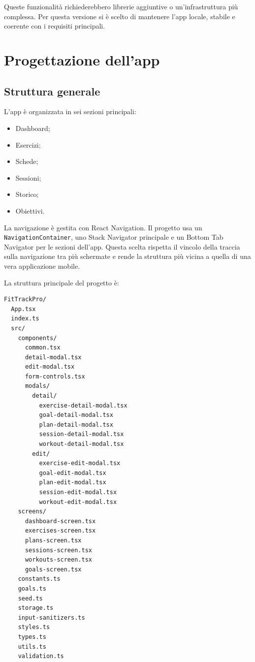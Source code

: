 \documentclass[11pt,a4paper]{article}
\begin{document}
Queste funzionalità richiederebbero librerie aggiuntive o un'infrastruttura più complessa. Per questa versione si è scelto di mantenere l'app locale, stabile e coerente con i requisiti principali.

\section{Progettazione dell'app}

\subsection{Struttura generale}

L'app è organizzata in sei sezioni principali:

\begin{itemize}
  \item Dashboard;
  \item Esercizi;
  \item Schede;
  \item Sessioni;
  \item Storico;
  \item Obiettivi.
\end{itemize}

La navigazione è gestita con React Navigation. Il progetto usa un \texttt{NavigationContainer}, uno Stack Navigator principale e un Bottom Tab Navigator per le sezioni dell'app. Questa scelta rispetta il vincolo della traccia sulla navigazione tra più schermate e rende la struttura più vicina a quella di una vera applicazione mobile.

La struttura principale del progetto è:

\begin{lstlisting}
FitTrackPro/
  App.tsx
  index.ts
  src/
    components/
      common.tsx
      detail-modal.tsx
      edit-modal.tsx
      form-controls.tsx
      modals/
        detail/
          exercise-detail-modal.tsx
          goal-detail-modal.tsx
          plan-detail-modal.tsx
          session-detail-modal.tsx
          workout-detail-modal.tsx
        edit/
          exercise-edit-modal.tsx
          goal-edit-modal.tsx
          plan-edit-modal.tsx
          session-edit-modal.tsx
          workout-edit-modal.tsx
    screens/
      dashboard-screen.tsx
      exercises-screen.tsx
      plans-screen.tsx
      sessions-screen.tsx
      workouts-screen.tsx
      goals-screen.tsx
    constants.ts
    goals.ts
    seed.ts
    storage.ts
    input-sanitizers.ts
    styles.ts
    types.ts
    utils.ts
    validation.ts
\end{lstlisting}
\end{document}
